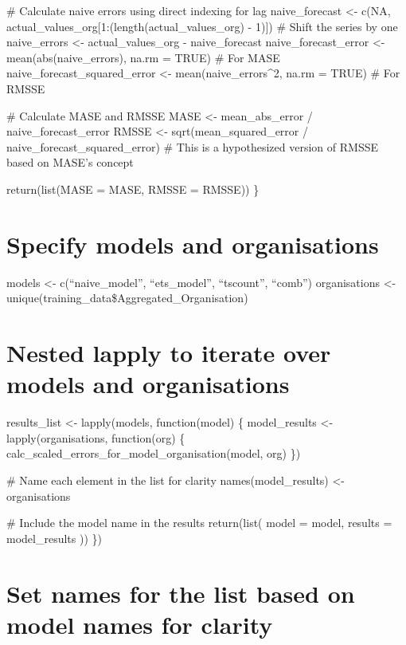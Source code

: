 \documentclass[
]{article}
\begin{document}
\# Calculate naive errors using direct indexing for lag
naive\_forecast \textless- c(NA, actual\_values\_org{[}1:(length(actual\_values\_org) - 1){]}) \# Shift the series by one
naive\_errors \textless- actual\_values\_org - naive\_forecast
naive\_forecast\_error \textless- mean(abs(naive\_errors), na.rm = TRUE) \# For MASE
naive\_forecast\_squared\_error \textless- mean(naive\_errors\^{}2, na.rm = TRUE) \# For RMSSE

\# Calculate MASE and RMSSE
MASE \textless- mean\_abs\_error / naive\_forecast\_error
RMSSE \textless- sqrt(mean\_squared\_error / naive\_forecast\_squared\_error) \# This is a hypothesized version of RMSSE based on MASE's concept

return(list(MASE = MASE, RMSSE = RMSSE))
\}

\hypertarget{specify-models-and-organisations}{%
\section{Specify models and organisations}\label{specify-models-and-organisations}}

models \textless- c(``naive\_model'', ``ets\_model'', ``tscount'', ``comb'')
organisations \textless- unique(training\_data\$Aggregated\_Organisation)

\hypertarget{nested-lapply-to-iterate-over-models-and-organisations}{%
\section{Nested lapply to iterate over models and organisations}\label{nested-lapply-to-iterate-over-models-and-organisations}}

results\_list \textless- lapply(models, function(model) \{
model\_results \textless- lapply(organisations, function(org) \{
calc\_scaled\_errors\_for\_model\_organisation(model, org)
\})

\# Name each element in the list for clarity
names(model\_results) \textless- organisations

\# Include the model name in the results
return(list(
model = model,
results = model\_results
))
\})

\hypertarget{set-names-for-the-list-based-on-model-names-for-clarity}{%
\section{Set names for the list based on model names for clarity}\label{set-names-for-the-list-based-on-model-names-for-clarity}}
\end{document}
